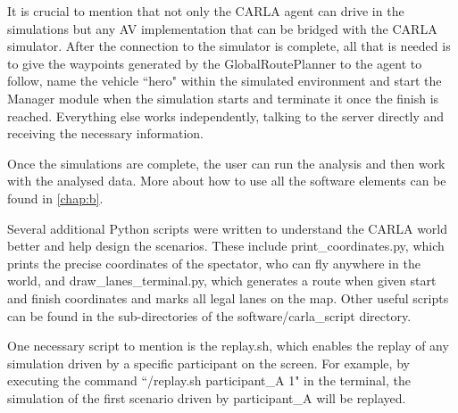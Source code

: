 It is crucial to mention that not only the CARLA agent can drive in the simulations but any AV implementation that can be bridged with the CARLA simulator. After the connection to the simulator is complete, all that is needed is to give the waypoints generated by the GlobalRoutePlanner to the agent to follow, name the vehicle ``hero" within the simulated environment and start the Manager module when the simulation starts and terminate it once the finish is reached. Everything else works independently, talking to the server directly and receiving the necessary information.

Once the simulations are complete, the user can run the analysis and then work with the analysed data. More about how to use all the software elements can be found in \autoref{chap:b}.

Several additional Python scripts were written to understand the CARLA world better and help design the scenarios. These include print\_coordinates.py, which prints the precise coordinates of the spectator, who can fly anywhere in the world, and draw\_lanes\_terminal.py, which generates a route when given start and finish coordinates and marks all legal lanes on the map. Other useful scripts can be found in the sub-directories of the software/carla\_script directory.

One necessary script to mention is the replay.sh, which enables the replay of any simulation driven by a specific participant on the screen. For example, by executing the command ``/replay.sh participant\_A 1" in the terminal, the simulation of the first scenario driven by participant\_A will be replayed.